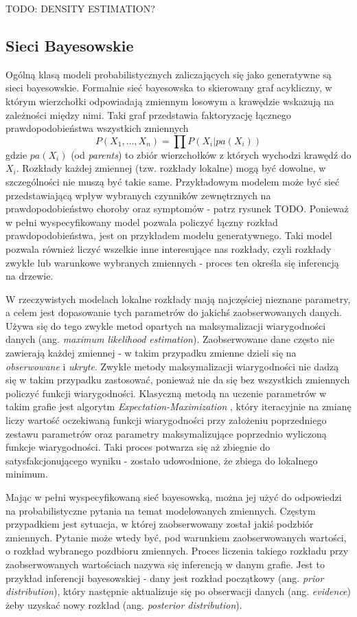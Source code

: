 \documentclass[magisterska]{pracamgr}
\begin{document}
TODO: DENSITY ESTIMATION?

\subsection{Sieci Bayesowskie}

Ogólną klasą modeli probabilistycznych zaliczających się jako generatywne są sieci bayesowskie. Formalnie sieć bayesowska to skierowany graf acykliczny, w którym wierzchołki odpowiadają zmiennym losowym a krawędzie wskazują na zależności między nimi. Taki graf przedstawia faktoryzację łącznego prawdopodobieństwa wszystkich zmiennych
\begin{equation}
    P(X_1, \ldots, X_n) = \prod P(X_i | pa(X_i))
\end{equation}
gdzie $pa(X_i)$ (od \textit{parents}) to zbiór wierzchołków z których wychodzi krawędź do $X_i$. Rozkłady każdej zmiennej (tzw. rozkłady lokalne) mogą być dowolne, w szczególności nie muszą być takie same. Przykładowym modelem może być sieć przedstawiającą wpływ wybranych czynników zewnętrznych na prawdopodobieństwo choroby oraz symptomów  - patrz rysunek TODO. Ponieważ w pełni wyspecyfikowany model pozwala policzyć łączny rozkład prawdopodobieństwa, jest on przykładem modelu generatywnego. Taki model pozwala również liczyć wszelkie inne interesujące nas rozkłady, czyli rozkłady zwykłe lub warunkowe wybranych zmiennych - proces ten określa się inferencją na drzewie.

W rzeczywistych modelach lokalne rozkłady mają najczęściej nieznane parametry, a celem jest dopasowanie tych parametrów do jakichś zaobserwowanych danych. Używa się do tego zwykle metod opartych na maksymalizacji wiarygodności danych (ang. \textit{maximum likelihood estimation}). Zaobserwowane dane często nie zawierają każdej zmiennej - w takim przypadku zmienne dzieli się na \textit{obserwowane} i \textit{ukryte}. Zwykłe metody maksymalizacji wiarygodności nie dadzą się w takim przypadku zastosować, ponieważ nie da się bez wszystkich zmiennych policzyć funkcji wiarygodności. Klasyczną metodą na uczenie parametrów w takim grafie jest algorytm \textit{Expectation-Maximization} \cite{dempster1977emalgorithm}, który iteracyjnie na zmianę liczy wartość oczekiwaną funkcji wiarygodności przy założeniu poprzedniego zestawu parametrów oraz parametry maksymalizujące poprzednio wyliczoną funkcje wiarygodności. Taki proces potwarza się aż zbiegnie do satysfakcjonującego wyniku - zostało udowodnione, że zbiega do lokalnego minimum.

Mając w pełni wyspecyfikowaną sieć bayesowską, można jej użyć do odpowiedzi na probabilistyczne pytania na temat modelowanych zmiennych. Częstym przypadkiem jest sytuacja, w której zaobserwowany został jakiś podzbiór zmiennych. Pytanie może wtedy być, pod warunkiem zaobserwowanych wartości, o rozkład wybranego pozdbioru zmiennych. Proces liczenia takiego rozkładu przy zaobserwowanych wartościach nazywa się inferencją w danym grafie. Jest to przykład inferencji bayesowskiej - dany jest rozkład początkowy (ang. \textit{prior distribution}), który następnie aktualizuje się po obserwacji danych (ang. \textit{evidence}) żeby uzyskać nowy rozkład (ang. \textit{posterior distribution}).
\end{document}
